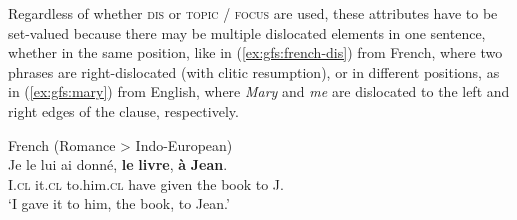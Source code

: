 \documentclass[output=paper]{../langscibook}
\begin{document}
 Regardless of whether \textsc{dis} or \textsc{topic} / \textsc{focus} are used, these attributes have to be set-valued because there may be multiple dislocated elements in one sentence, whether in the same position, like in (\ref{ex:gfs:french-dis}) from French, where two phrases are right-dislocated (with clitic resumption), or in different positions, as in (\ref{ex:gfs:mary}) from English, where \textit{Mary} and \textit{me} are dislocated to the left and right edges of the clause, respectively.
 
 \ea\label{ex:gfs:french-dis}
 \ea
 French (Romance > Indo-European)\\
 \gll Je le lui ai donné, \textbf{le} \textbf{livre}, \textbf{à} \textbf{Jean}.\\
 I.\textsc{cl} it.\textsc{cl} to.him.\textsc{cl} have given the book to J.\\
 \glt`I gave it to him, the book, to Jean.'
 
 \ex {}
 \z
 \z
 
\end{document}
